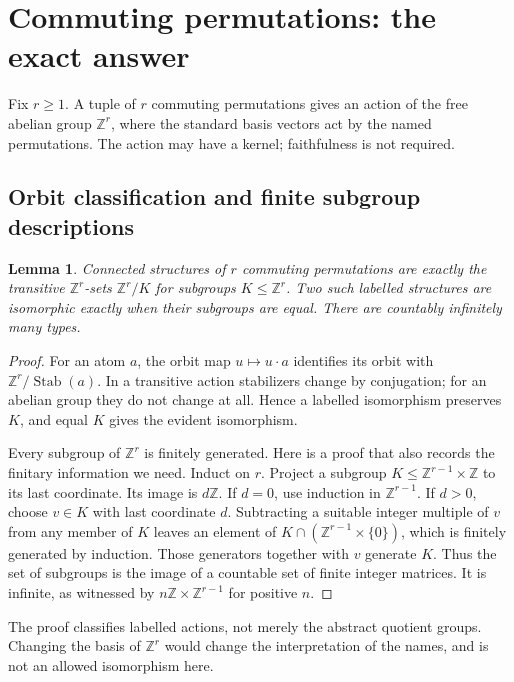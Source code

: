 \documentclass[11pt,letterpaper]{article}
\numberwithin{equation}{section}
\theoremstyle{plain}
\newtheorem{lemma}[lemma]{Lemma}
\theoremstyle{definition}
\theoremstyle{remark}
\newcommand{\ZZ}{\mathbb Z}
\newcommand{\Stab}{\operatorname{Stab}}
\begin{document}
\section{Commuting permutations: the exact answer}\label{nee:ca:sec:commuting}

Fix $r\geq1$. A tuple of $r$ commuting permutations gives an action of the free abelian group $\ZZ^r$, where the standard basis vectors act by the named permutations. The action may have a kernel; faithfulness is not required.

\subsection{Orbit classification and finite subgroup descriptions}

\begin{lemma}\label{nee:ca:lem:abelian-types}
Connected structures of $r$ commuting permutations are exactly the transitive $\ZZ^r$-sets $\ZZ^r/K$ for subgroups $K\leq\ZZ^r$. Two such labelled structures are isomorphic exactly when their subgroups are equal. There are countably infinitely many types.
\end{lemma}
\begin{proof}
For an atom $a$, the orbit map $u\mapsto u\cdot a$ identifies its orbit with $\ZZ^r/\Stab(a)$. In a transitive action stabilizers change by conjugation; for an abelian group they do not change at all. Hence a labelled isomorphism preserves $K$, and equal $K$ gives the evident isomorphism.

Every subgroup of $\ZZ^r$ is finitely generated. Here is a proof that also records the finitary information we need. Induct on $r$. Project a subgroup $K\leq\ZZ^{r-1}\times\ZZ$ to its last coordinate. Its image is $d\ZZ$. If $d=0$, use induction in $\ZZ^{r-1}$. If $d>0$, choose $v\in K$ with last coordinate $d$. Subtracting a suitable integer multiple of $v$ from any member of $K$ leaves an element of $K\cap(\ZZ^{r-1}\times\{0\})$, which is finitely generated by induction. Those generators together with $v$ generate $K$. Thus the set of subgroups is the image of a countable set of finite integer matrices. It is infinite, as witnessed by $n\ZZ\times\ZZ^{r-1}$ for positive $n$.
\end{proof}

The proof classifies labelled actions, not merely the abstract quotient groups. Changing the basis of $\ZZ^r$ would change the interpretation of the names, and is not an allowed isomorphism here.
\end{document}
